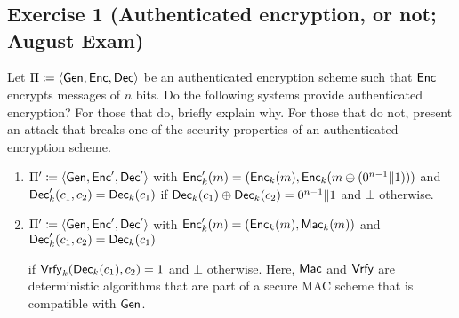 
\section{}

\subsection{Exercise 1 (Authenticated encryption, or not; August Exam)}

Let $\Pi \define \langle \Gen, \Enc, \Dec\rangle$ be an authenticated encryption
scheme such that $\Enc$ encrypts messages of $n$ bits.
%
Do the following systems provide authenticated encryption?  For those
that do, briefly explain why.  For those that do not, present an
attack that breaks one of the security properties of an authenticated
encryption scheme.

\begin{enumerate}
	\item $\Pi' \define \langle \Gen, \Enc', \Dec'\rangle$ with
	$\Enc'_k(m) = (\Enc_k(m), \Enc_k(m \oplus (0^{n-1}\|1)))$ and
	$\Dec'_k(c_1, c_2) = \Dec_k(c_1)$ if
	$\Dec_k(c_1) \oplus \Dec_k(c_2) = 0^{n-1}\|1$ and $\bot$ otherwise.

	\item $\Pi' \define \langle \Gen, \Enc', \Dec'\rangle$ with
	$\Enc'_k(m) = (\Enc_k(m), \Mac_k(m))$ and $\Dec'_k(c_1, c_2) = \Dec_k(c_1)$

	if $\Vrfy_k(\Dec_k(c_1), c_2)=1$ and $\bot$ otherwise. Here, $\Mac$
	and $\Vrfy$ are deterministic algorithms that are part of a secure
	MAC scheme that is compatible with $\Gen$.
\end{enumerate}

